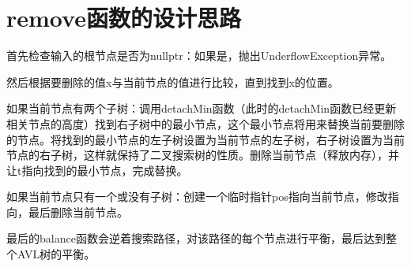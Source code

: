 \documentclass[UTF8]{ctexart}
\begin{document}
\pagestyle{fancy}
\fancyhead{}

\section{remove函数的设计思路}
	
首先检查输入的根节点是否为nullptr：如果是，抛出UnderflowException异常。

然后根据要删除的值x与当前节点的值进行比较，直到找到x的位置。

如果当前节点有两个子树：调用detachMin函数（此时的detachMin函数已经更新相关节点的高度）找到右子树中的最小节点，这个最小节点将用来替换当前要删除的节点。将找到的最小节点的左子树设置为当前节点的左子树，右子树设置为当前节点的右子树，这样就保持了二叉搜索树的性质。删除当前节点（释放内存），并让t指向找到的最小节点，完成替换。

如果当前节点只有一个或没有子树：创建一个临时指针pos指向当前节点，修改指向，最后删除当前节点。

最后的balance函数会逆着搜索路径，对该路径的每个节点进行平衡，最后达到整个AVL树的平衡。
\end{document}
